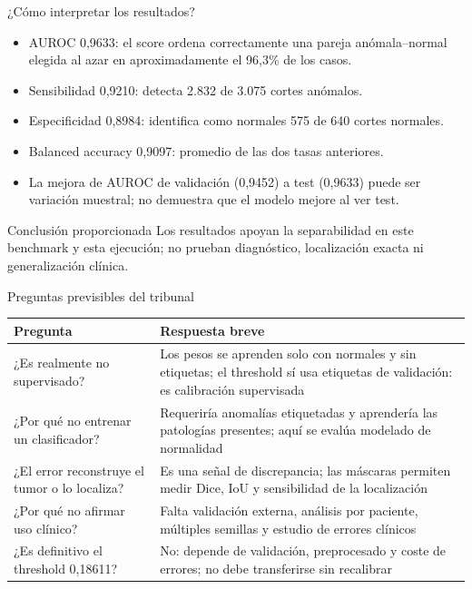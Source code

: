 \documentclass[10pt,aspectratio=169]{beamer}
\begin{document}
\begin{frame}{¿Cómo interpretar los resultados?}
  \begin{itemize}
    \item AUROC 0,9633: el score ordena correctamente una pareja
          anómala--normal elegida al azar en aproximadamente el 96,3\% de los casos.
    \item Sensibilidad 0,9210: detecta 2.832 de 3.075 cortes anómalos.
    \item Especificidad 0,8984: identifica como normales 575 de 640 cortes normales.
    \item Balanced accuracy 0,9097: promedio de las dos tasas anteriores.
    \item La mejora de AUROC de validación (0,9452) a test (0,9633) puede ser
          variación muestral; no demuestra que el modelo mejore al ver test.
  \end{itemize}

  \begin{alertblock}{Conclusión proporcionada}
    Los resultados apoyan la separabilidad en este benchmark y esta ejecución;
    no prueban diagnóstico, localización exacta ni generalización clínica.
  \end{alertblock}
\end{frame}

\begin{frame}{Preguntas previsibles del tribunal}
  \small
  \begin{tabular}{p{5.0cm}p{6.9cm}}
    \toprule
    Pregunta & Respuesta breve \\
    \midrule
    ¿Es realmente no supervisado? & Los pesos se aprenden solo con normales y sin etiquetas; el threshold sí usa etiquetas de validación: es calibración supervisada \\
    ¿Por qué no entrenar un clasificador? & Requeriría anomalías etiquetadas y aprendería las patologías presentes; aquí se evalúa modelado de normalidad \\
    ¿El error reconstruye el tumor o lo localiza? & Es una señal de discrepancia; las máscaras permiten medir Dice, IoU y sensibilidad de la localización \\
    ¿Por qué no afirmar uso clínico? & Falta validación externa, análisis por paciente, múltiples semillas y estudio de errores clínicos \\
    ¿Es definitivo el threshold 0,18611? & No: depende de validación, preprocesado y coste de errores; no debe transferirse sin recalibrar \\
    \bottomrule
  \end{tabular}
\end{frame}
\end{document}
